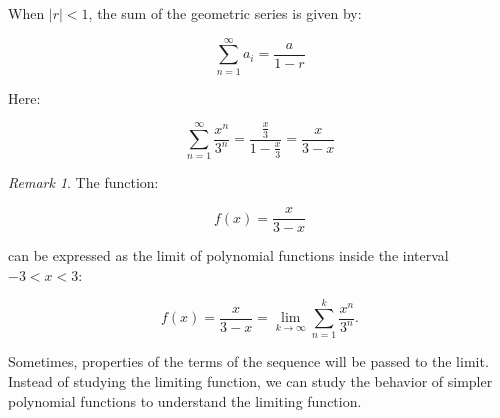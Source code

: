 \documentclass[
]{book}
\theoremstyle{definition}
\theoremstyle{definition}
\theoremstyle{definition}
\theoremstyle{definition}
\theoremstyle{remark}
\newtheorem*{remark}{Remark}
\begin{document}
When \(|r| < 1\), the sum of the geometric series is given by:

\[\sum_{n=1}^\infty a_i = \frac{a}{1-r}\]

Here:

\[\sum_{n=1}^\infty \frac{x^n}{3^n} = \frac{\frac{x}{3}}{1 - \frac{x}{3}} = \frac{x}{3 - x}\]

\begin{remark}
The function:

\[
f(x) = \frac{x}{3 - x}
\]

can be expressed as the limit of polynomial functions inside the interval \(-3 < x < 3\):

\[
f(x) = \frac{x}{3 - x} = \lim_{k \to \infty} \sum_{n=1}^k \frac{x^n}{3^n}.
\]

Sometimes, properties of the terms of the sequence will be passed to the limit. Instead of studying the limiting function, we can study the behavior of simpler polynomial functions to understand the limiting function.
\end{remark}

  
\end{document}
